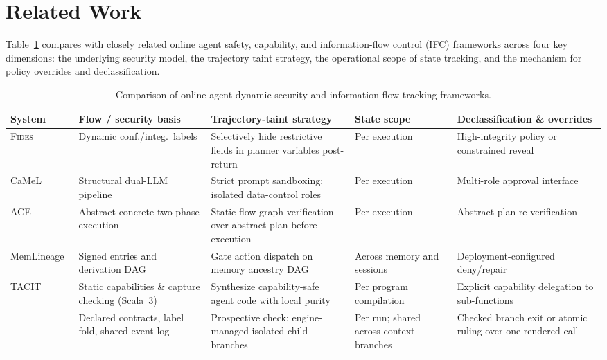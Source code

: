 \section{Related Work}\label{sec:related}

Table~\ref{tab:systems} compares \appa{} with closely related online agent safety, capability, and information-flow control (IFC) frameworks across four key dimensions: the underlying security model, the trajectory taint strategy, the operational scope of state tracking, and the mechanism for policy overrides and declassification.

\begin{table}[t]
  \caption{Comparison of online agent dynamic security and information-flow tracking frameworks.}
  \label{tab:systems}
  \small
  \begin{tabularx}{\textwidth}{@{}lXXXX@{}}
    \toprule
    System & Flow / security basis & Trajectory-taint strategy &
    State scope & Declassification \& overrides \\
    \midrule
    \textsc{Fides}~\cite{fides} &
    Dynamic conf./integ.\ labels &
    Selectively hide restrictive fields in planner variables post-return &
    Per execution & High-integrity policy or constrained reveal \\
    CaMeL~\cite{camel2025} &
    Structural dual-LLM pipeline &
    Strict prompt sandboxing; isolated data-control roles &
    Per execution & Multi-role approval interface \\
    ACE~\cite{li2026ace} &
    Abstract-concrete two-phase execution &
    Static flow graph verification over abstract plan before execution &
    Per execution & Abstract plan re-verification \\
    MemLineage~\cite{ouyangMemLineageLineageGuidedEnforcement2026} &
    Signed entries and derivation DAG &
    Gate action dispatch on memory ancestry DAG &
    Across memory and sessions & Deployment-configured deny/repair \\
    TACIT~\cite{odersky2026tracking} &
    Static capabilities \& capture checking (Scala~3) &
    Synthesize capability-safe agent code with local purity &
    Per program compilation & Explicit capability delegation to sub-functions \\
    \appa{} &
    Declared contracts, label fold, shared event log &
    Prospective check; engine-managed isolated child branches &
    Per run; shared across context branches &
    Checked branch exit or atomic ruling over one rendered call \\
    \bottomrule
  \end{tabularx}
\end{table}

